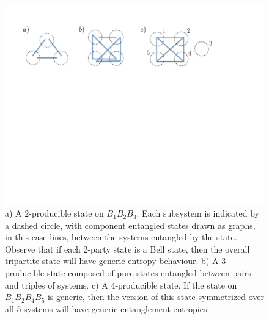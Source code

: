 \documentclass[12pt]{article}
\numberwithin{equation}{section}
\begin{document}
\begin{figure}
\centering
\includegraphics[keepaspectratio,width=0.8\linewidth]{kproducible.pdf}
\caption{a) A $2$-producible state on $B_1B_2B_3$. Each subsystem is indicated by a dashed circle, with component entangled states drawn as graphs, in this case lines, between the systems entangled by the state. Observe that if each $2$-party state is a Bell state, then the overall tripartite state will have generic entropy behaviour. b) A $3$-producible state composed of pure states entangled between pairs and triples of systems. c) A $4$-producible state. If the state on $B_1 B_2 B_4 B_5$ is generic, then the version of this state symmetrized over all 5 systems will have generic entanglement entropies.}
\label{fig:kprod}
\end{figure}
\end{document}
